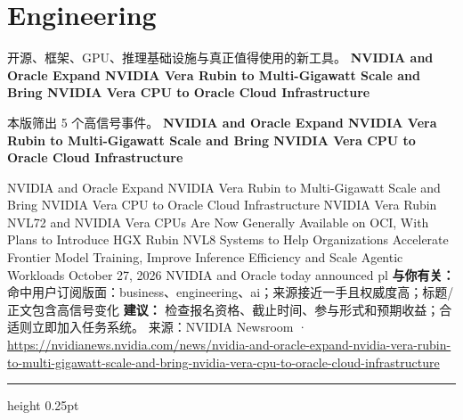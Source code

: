 \documentclass[10.5pt]{ctexart}
\begin{document}
\section*{Engineering}
{\color{ormuted} 开源、框架、GPU、推理基础设施与真正值得使用的新工具。}
\vspace{2mm}
{\LARGE\bfseries NVIDIA and Oracle Expand NVIDIA Vera Rubin to Multi-Gigawatt Scale and Bring NVIDIA Vera CPU to Oracle Cloud Infrastructure}\par
\vspace{1mm}
{\color{ormuted} 本版筛出 5 个高信号事件。}
\vspace{3mm}
{\Large\bfseries NVIDIA and Oracle Expand NVIDIA Vera Rubin to Multi-Gigawatt Scale and Bring NVIDIA Vera CPU to Oracle Cloud Infrastructure}\par
NVIDIA and Oracle Expand NVIDIA Vera Rubin to Multi-Gigawatt Scale and Bring NVIDIA Vera CPU to Oracle Cloud Infrastructure NVIDIA Vera Rubin NVL72 and NVIDIA Vera CPUs Are Now Generally Available on OCI, With Plans to Introduce HGX Rubin NVL8 Systems to Help Organizations Accelerate Frontier Model Training, Improve Inference Efficiency and Scale Agentic Workloads October 27, 2026 NVIDIA and Oracle today announced pl
\textbf{与你有关：} 命中用户订阅版面：business、engineering、ai；来源接近一手且权威度高；标题/正文包含高信号变化
\textbf{建议：} 检查报名资格、截止时间、参与形式和预期收益；合适则立即加入任务系统。
{\footnotesize\color{ormuted} 来源：NVIDIA Newsroom · \url{https://nvidianews.nvidia.com/news/nvidia-and-oracle-expand-nvidia-vera-rubin-to-multi-gigawatt-scale-and-bring-nvidia-vera-cpu-to-oracle-cloud-infrastructure}}
\vspace{4mm}
\hrule height 0.25pt
\vspace{3mm}
\end{document}
